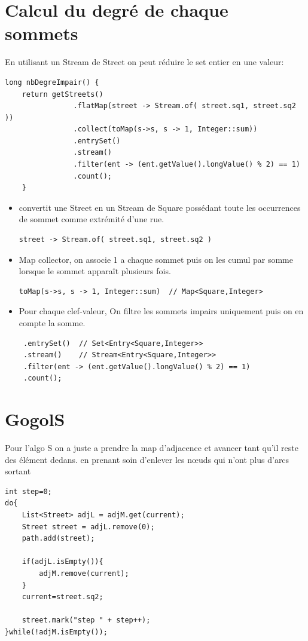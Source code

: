 \documentclass[a4paper, 11pt]{article}
\begin{document}
\section{Calcul du degré de chaque sommets}
En utilisant un Stream de Street on peut réduire le set entier en une
  valeur:
\begin{verbatim}
long nbDegreImpair() {	
    return getStreets()
                .flatMap(street -> Stream.of( street.sq1, street.sq2 ))
                .collect(toMap(s->s, s -> 1, Integer::sum))
                .entrySet()
                .stream()
                .filter(ent -> (ent.getValue().longValue() % 2) == 1)
                .count();
    }
\end{verbatim}
\begin{itemize}
  \item convertit une Street en un Stream de Square possédant toute les occurrences de
sommet comme extrémité d'une rue.
\begin{verbatim}
street -> Stream.of( street.sq1, street.sq2 )
\end{verbatim} 
  \item Map collector, on associe 1 a chaque sommet puis on les cumul par somme lorsque
le sommet apparaît plusieurs fois.
\begin{verbatim}
toMap(s->s, s -> 1, Integer::sum)  // Map<Square,Integer>
\end{verbatim}
  \item Pour chaque clef-valeur, On filtre les sommets impairs uniquement puis on
en compte la somme.
\begin{verbatim}
 .entrySet()  // Set<Entry<Square,Integer>>
 .stream()    // Stream<Entry<Square,Integer>>
 .filter(ent -> (ent.getValue().longValue() % 2) == 1) 
 .count();
\end{verbatim}
\end{itemize}



\section*{GogolS}
Pour l'algo S on a juste a prendre la map d'adjacence et avancer tant qu'il
reste des élément dedans. en prenant soin d'enlever les nœuds qui n'ont plus
d'arcs sortant
\begin{verbatim}
int step=0;
do{
    List<Street> adjL = adjM.get(current);
    Street street = adjL.remove(0);
    path.add(street);
			
    if(adjL.isEmpty()){
        adjM.remove(current);
    }
    current=street.sq2;
			
    street.mark("step " + step++);
}while(!adjM.isEmpty());
\end{verbatim}
\end{document}
